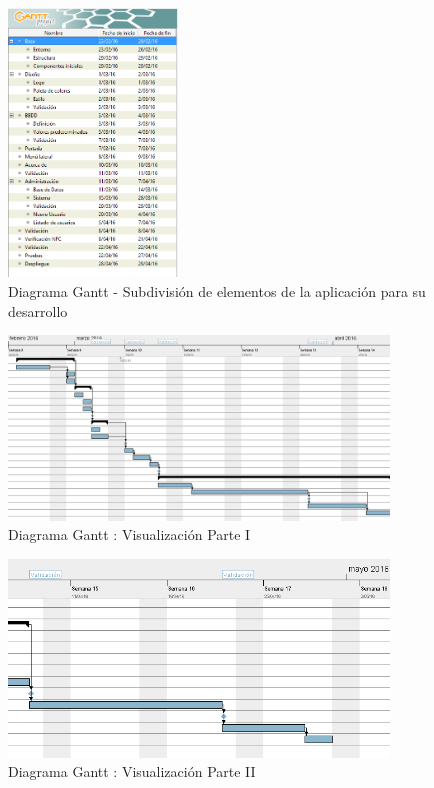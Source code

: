 \documentclass[../PFC.tex]{subfiles}
\begin{document}
\begin{figure}[H]
  \centering
  \includegraphics[width=0.4\textwidth]{./img/gantt-base}
  \caption{Diagrama Gantt - Subdivisión de elementos de la aplicación para su desarrollo}
  \label{img:gantt-base}
\end{figure}

\begin{figure}[H]
  \centering
  \includegraphics[width=0.9\textwidth]{./img/gantt1}
  \caption{Diagrama Gantt : Visualización Parte I }
  \label{img:gantt1}
\end{figure}

\begin{figure}[H]
  \centering
  \includegraphics[width=0.9\textwidth]{./img/gantt2}
  \caption{Diagrama Gantt : Visualización Parte II }
  \label{img:gantt2}
\end{figure}
\end{document}
